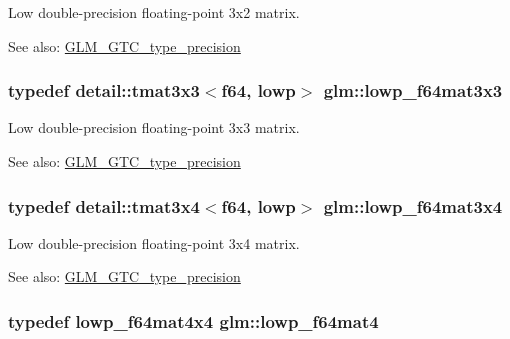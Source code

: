 Low double-precision floating-point 3x2 matrix. \begin{Desc}
\item[See also:]\hyperlink{group__gtc__type__precision}{GLM\_\-GTC\_\-type\_\-precision} \end{Desc}
\hypertarget{group__gtc__type__precision_g3b636bef3048da2f7935eae13e66f7b3}{
\subsubsection[lowp\_\-f64mat3x3]{\setlength{\rightskip}{0pt plus 5cm}typedef detail::tmat3x3$<$f64, lowp$>$ {\bf glm::lowp\_\-f64mat3x3}}}
\label{group__gtc__type__precision_g3b636bef3048da2f7935eae13e66f7b3}


Low double-precision floating-point 3x3 matrix. \begin{Desc}
\item[See also:]\hyperlink{group__gtc__type__precision}{GLM\_\-GTC\_\-type\_\-precision} \end{Desc}
\hypertarget{group__gtc__type__precision_g988c6645dead17a842c47ec042b5369e}{
\subsubsection[lowp\_\-f64mat3x4]{\setlength{\rightskip}{0pt plus 5cm}typedef detail::tmat3x4$<$f64, lowp$>$ {\bf glm::lowp\_\-f64mat3x4}}}
\label{group__gtc__type__precision_g988c6645dead17a842c47ec042b5369e}


Low double-precision floating-point 3x4 matrix. \begin{Desc}
\item[See also:]\hyperlink{group__gtc__type__precision}{GLM\_\-GTC\_\-type\_\-precision} \end{Desc}
\hypertarget{group__gtc__type__precision_g4378d9384f1b24848043ccb02dcf2959}{
\subsubsection[lowp\_\-f64mat4]{\setlength{\rightskip}{0pt plus 5cm}typedef lowp\_\-f64mat4x4 {\bf glm::lowp\_\-f64mat4}}}
\label{group__gtc__type__precision_g4378d9384f1b24848043ccb02dcf2959}


